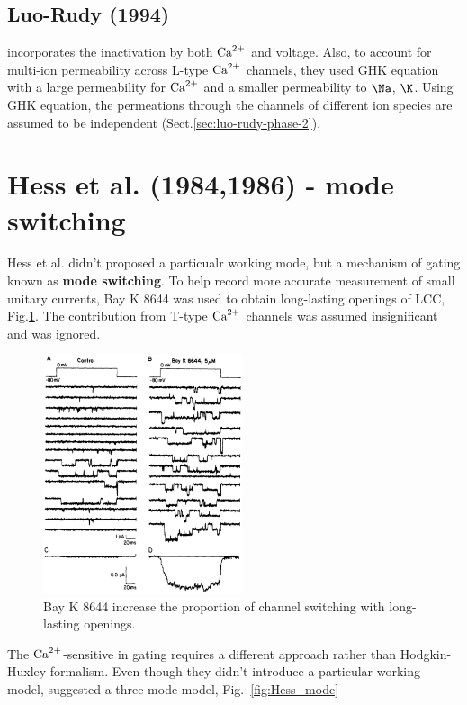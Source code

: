 \subsection{Luo-Rudy (1994)}
\label{sec:LCC_Luo1994}

\citep{luo1994dmc_a} incorporates the inactivation by both ${\text{Ca}^{2+}}$ and voltage.
Also, to account for multi-ion permeability across L-type ${\text{Ca}^{2+}}$ channels, they
used GHK equation with a large permeability for ${\text{Ca}^{2+}}$ and a smaller permeability to
$\Na$, $\K$. Using GHK equation, the permeations through the channels of
different ion species are assumed to be independent
(Sect.\ref{sec:luo-rudy-phase-2}).

\section{Hess et al. (1984,1986) - mode switching}
\label{sec:LCC_Hess1984}

Hess et al. didn't proposed a particualr working mode, but a mechanism of gating
known as {\bf mode switching}. To help record more accurate measurement of small
unitary currents, Bay K 8644 was used to obtain long-lasting openings of LCC,
Fig.\ref{fig:BayK8644}. The contribution from T-type ${\text{Ca}^{2+}}$ channels was
assumed insignificant and was ignored.

\begin{figure}[hbt]
 \centerline{\includegraphics[height=7cm, angle=0]{./images/BayK8644.eps}}
\caption{Bay K 8644 increase the proportion of channel switching with
  long-lasting openings.}
\label{fig:BayK8644}
\end{figure}

The ${\text{Ca}^{2+}}$-sensitive in gating requires a different approach rather than
Hodgkin-Huxley formalism. Even though they didn't introduce a particular working
model, \citep{hess1986ccs} suggested a three mode model,
Fig.~\ref{fig:Hess_mode}

